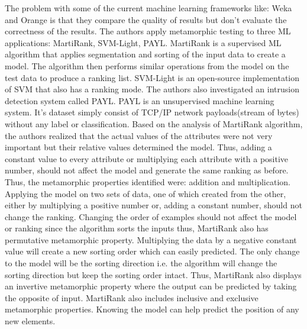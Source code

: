 The problem with some of the current machine learning frameworks like: Weka and Orange is that they compare the quality of results but don’t evaluate the correctness of the results. The authors apply metamorphic testing to three ML applications: MartiRank, SVM-Light, PAYL.
MartiRank is a supervised ML algorithm that applies segmentation and sorting of the input data to create a model. The algorithm then performs similar operations from the model on the test data to produce a ranking list. SVM-Light is an open-source implementation of SVM that also has a ranking mode. The authors also investigated an intrusion detection system called PAYL. PAYL is an unsupervised machine learning system. It’s dataset simply consist of TCP/IP network payloads(stream of bytes) without any label or classification.
Based on the analysis of MartiRank algorithm, the authors realized that the actual values of the attributes were not very important but their relative values determined the model. Thus, adding a constant value to every attribute or multiplying each attribute with a positive number, should not affect the model and generate the same ranking as before. Thus, the metamorphic properties identified were: addition and multiplication. Applying the model on two sets of data, one of which created from the other, either by multiplying a positive number or, adding a constant number, should not change the ranking. Changing the order of examples should not affect the model or ranking since the algorithm sorts the inputs thus, MartiRank also has permutative metamorphic property. Multiplying the data by a negative constant value will create a new sorting order which can easily predicted. The only change to the model will be the sorting direction i.e. the algorithm will change the sorting direction but keep the sorting order intact. Thus, MartiRank also displays an invertive metamorphic property where the output can be predicted by taking the opposite of input. MartiRank also includes inclusive and exclusive metamorphic properties. Knowing the model can help predict the position of any new elements.

